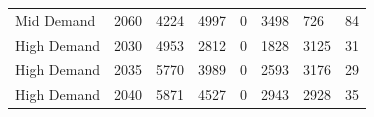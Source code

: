 \documentclass[preprint,12pt]{elsarticle}
\begin{document}
\begin{table}[h]
\begin{tabular}{llllllll}
    Mid Demand                            & 2060                              & 4224                                                                                             & 4997                                                                                             & 0                                                                                                  & 3498                                                                                                               & 726                                                                                                           & 84                                                                                            \\
    High Demand                           & 2030                              & 4953                                                                                             & 2812                                                                                             & 0                                                                                                  & 1828                                                                                                               & 3125                                                                                                          & 31                                                                                            \\
    High Demand                           & 2035                              & 5770                                                                                             & 3989                                                                                             & 0                                                                                                  & 2593                                                                                                               & 3176                                                                                                          & 29                                                                                            \\
    High Demand                           & 2040                              & 5871                                                                                             & 4527                                                                                             & 0                                                                                                  & 2943                                                                                                               & 2928                                                                                                          & 35                                                                                            \\

\end{tabular}
\end{table}
\end{document}
